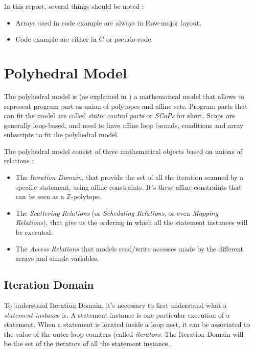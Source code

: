 \documentclass[paper=a4, fontsize=11.5pt]{scrartcl}
\numberwithin{equation}{section}        %
\numberwithin{figure}{section}          %
\numberwithin{table}{section}               %
\begin{document}
    In this report, several things should be noted :
    \begin{itemize}
        \item Arrays used in code example are always in Row-major layout.
        \item Code example are either in C or pseudo-code.
    \end{itemize}

\section{Polyhedral Model}
The polyhedral model is (as explained in \cite{Bas'12}) a mathematical model that allows to represent program
part as union of polytopes and affine sets. Program parts that can fit the model
are called \textit{static control parts} or \textit{SCoPs} for short.
Scops are generally loop-based, and need to have affine loop bounds, conditions and
array subscripts to fit the polyhedral model.

The polyhedral model consist of three mathematical objects based on unions of relations :
\begin{itemize}
    \item The \textit{Iteration Domain}, that provide the set of all the iteration scanned
        by a specific statement, using affine constraints. It's these affine constraints 
        that can be seen as a $\mathbb{Z}$-polytope.
    \item The \textit{Scattering Relations} (or \textit{Scheduling Relations},
        or even \textit{Mapping Relations}), that give us the ordering in which
        all the statement instances will be executed.
    \item The \textit{Access Relations} that models read/write accesses made by
        the different arrays and simple variables.
\end{itemize}

    \subsection{Iteration Domain}
        To understand Iteration Domain, it's necessary to first understand what a \textit{statement instance}
        is. A statement instance is one particular execution of a statement.
        When a statement is located inside a loop nest, it can be associated to the value
        of the outer-loop counters (called \textit{iterators}.
        The Iteration Domain will be the set of the iterators of all the statement
        instance.
\end{document}
